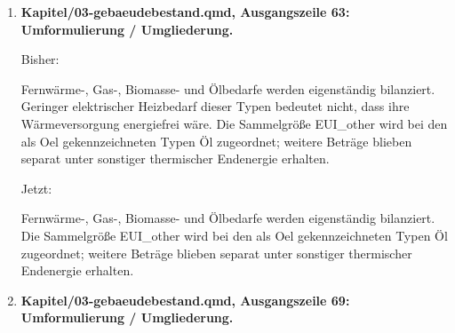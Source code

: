 \documentclass[
  ngerman,
  a4paper,
  DIV=11]{scrreprt}
\newenvironment{Shaded}{\begin{snugshade}}{\end{snugshade}}
\newcommand{\NormalTok}[1]{\textcolor[rgb]{0.00,0.23,0.31}{#1}}
\begin{document}
\begin{enumerate}
  Jetzt:

\begin{Shaded}
\begin{Highlighting}[]

\NormalTok{Die PV{-}Erzeugung wird **aus der Typen{-}Excel übernommen**: \textasciigrave{}PV\_total\_direct\textasciigrave{} plus \textasciigrave{}PV\_to\_Egrid\textasciigrave{} in \textasciigrave{}Strombed\_estim\textasciigrave{}, gegengeprüft gegen \textasciigrave{}PV\_total\textasciigrave{} in \textasciigrave{}Tabelle2\textasciigrave{}. Das Sektormodell simuliert keine eigenen PV{-}Flächen oder Erträge. Alle gelieferten Typen verwenden die Variante \textasciigrave{}PV30|noFlex\textasciigrave{}. Die nationale Erzeugung entsteht durch Multiplikation des spezifischen Ertrags mit der zugeordneten NGF; eine zusätzliche GFZ{-}bedingte Skalierung der PV findet nicht statt.}
\end{Highlighting}
\end{Shaded}
\item
  \textbf{Kapitel/03-gebaeudebestand.qmd, Ausgangszeile 63:
  Umformulierung / Umgliederung.}

  Bisher:

\begin{Shaded}
\begin{Highlighting}[]
\NormalTok{Fernwärme{-}, Gas{-}, Biomasse{-} und Ölbedarfe werden eigenständig bilanziert. Geringer elektrischer Heizbedarf dieser Typen bedeutet nicht, dass ihre Wärmeversorgung energiefrei wäre. Die Sammelgröße \textasciigrave{}EUI\_other\textasciigrave{} wird bei den als \textasciigrave{}Oel\textasciigrave{} gekennzeichneten Typen Öl zugeordnet; weitere Beträge blieben separat unter sonstiger thermischer Endenergie erhalten.}
\end{Highlighting}
\end{Shaded}

  Jetzt:

\begin{Shaded}
\begin{Highlighting}[]
\NormalTok{Fernwärme{-}, Gas{-}, Biomasse{-} und Ölbedarfe werden eigenständig bilanziert. Die Sammelgröße \textasciigrave{}EUI\_other\textasciigrave{} wird bei den als \textasciigrave{}Oel\textasciigrave{} gekennzeichneten Typen Öl zugeordnet; weitere Beträge blieben separat unter sonstiger thermischer Endenergie erhalten.}
\end{Highlighting}
\end{Shaded}
\item
  \textbf{Kapitel/03-gebaeudebestand.qmd, Ausgangszeile 69:
  Umformulierung / Umgliederung.}


\end{enumerate}
\end{document}

